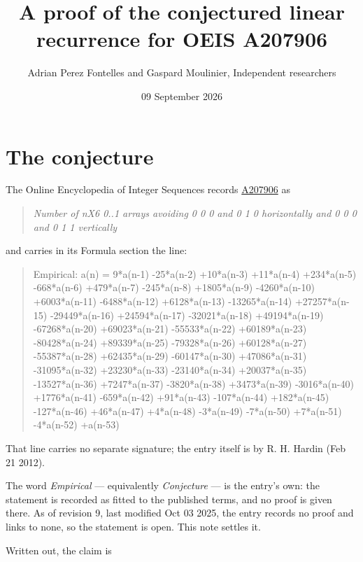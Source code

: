 \documentclass[11pt]{article}
\title{A proof of the conjectured linear recurrence for OEIS A207906}
\author{Adrian Perez Fontelles and Gaspard Moulinier, Independent researchers}
\date{09 September 2026}
\theoremstyle{definition}
\begin{document}
\maketitle
\section{The conjecture}

The Online Encyclopedia of Integer Sequences records \href{https://oeis.org/A207906}{A207906} as

\begin{quote}\itshape Number of nX6 0..1 arrays avoiding 0 0 0 and 0 1 0 horizontally and 0 0 0 and 0 1 1 vertically\end{quote}

and carries in its Formula section the line:

\begin{quote}\ttfamily Empirical: a(n) = 9*a(n-1) -25*a(n-2) +10*a(n-3) +11*a(n-4) +234*a(n-5) -668*a(n-6) +479*a(n-7) -245*a(n-8) +1805*a(n-9) -4260*a(n-10) +6003*a(n-11) -6488*a(n-12) +6128*a(n-13) -13265*a(n-14) +27257*a(n-15) -29449*a(n-16) +24594*a(n-17) -32021*a(n-18) +49194*a(n-19) -67268*a(n-20) +69023*a(n-21) -55533*a(n-22) +60189*a(n-23) -80428*a(n-24) +89339*a(n-25) -79328*a(n-26) +60128*a(n-27) -55387*a(n-28) +62435*a(n-29) -60147*a(n-30) +47086*a(n-31) -31095*a(n-32) +23230*a(n-33) -23140*a(n-34) +20037*a(n-35) -13527*a(n-36) +7247*a(n-37) -3820*a(n-38) +3473*a(n-39) -3016*a(n-40) +1776*a(n-41) -659*a(n-42) +91*a(n-43) -107*a(n-44) +182*a(n-45) -127*a(n-46) +46*a(n-47) +4*a(n-48) -3*a(n-49) -7*a(n-50) +7*a(n-51) -4*a(n-52) +a(n-53)\end{quote}

That line carries no separate signature; the entry itself is by R. H. Hardin (Feb 21 2012).

The word {\itshape Empirical} --- equivalently {\itshape Conjecture} --- is the entry's own: the statement is recorded as fitted to the published terms, and no proof is given there. As of revision 9, last modified Oct 03 2025, the entry records no proof and links to none, so the statement is open. This note settles it.

Written out, the claim is
\end{document}
